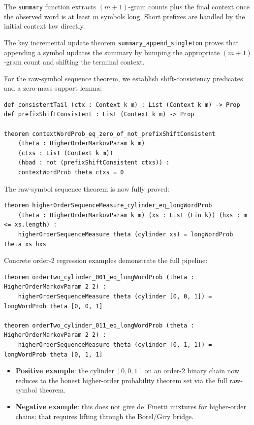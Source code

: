 \documentclass[11pt,a4paper]{article}
\theoremstyle{definition}
\begin{document}
The \texttt{summary} function extracts $(m+1)$-gram counts plus the final
context once the observed word is at least $m$ symbols long. Short prefixes
are handled by the initial context law directly.

The key incremental update theorem \texttt{summary\_append\_singleton} proves
that appending a symbol updates the summary by bumping the appropriate
$(m+1)$-gram count and shifting the terminal context.

For the raw-symbol sequence theorem, we establish shift-consistency predicates
and a zero-mass support lemma:
\begin{lstlisting}
def consistentTail (ctx : Context k m) : List (Context k m) -> Prop
def prefixShiftConsistent : List (Context k m) -> Prop

theorem contextWordProb_eq_zero_of_not_prefixShiftConsistent
    (theta : HigherOrderMarkovParam k m)
    (ctxs : List (Context k m))
    (hbad : not (prefixShiftConsistent ctxs)) :
    contextWordProb theta ctxs = 0
\end{lstlisting}

The raw-symbol sequence theorem is now fully proved:
\begin{lstlisting}
theorem higherOrderSequenceMeasure_cylinder_eq_longWordProb
    (theta : HigherOrderMarkovParam k m) (xs : List (Fin k)) (hxs : m <= xs.length) :
    higherOrderSequenceMeasure theta (cylinder xs) = longWordProb theta xs hxs
\end{lstlisting}

Concrete order-2 regression examples demonstrate the full pipeline:
\begin{lstlisting}
theorem orderTwo_cylinder_001_eq_longWordProb (theta : HigherOrderMarkovParam 2 2) :
    higherOrderSequenceMeasure theta (cylinder [0, 0, 1]) = longWordProb theta [0, 0, 1]

theorem orderTwo_cylinder_011_eq_longWordProb (theta : HigherOrderMarkovParam 2 2) :
    higherOrderSequenceMeasure theta (cylinder [0, 1, 1]) = longWordProb theta [0, 1, 1]
\end{lstlisting}

\begin{itemize}
\item \textbf{Positive example}: the cylinder $[0,0,1]$ on an order-2 binary chain
  now reduces to the honest higher-order probability theorem set via the full
  raw-symbol theorem.
\item \textbf{Negative example}: this does not give de~Finetti mixtures for
  higher-order chains; that requires lifting through the Borel/Giry bridge.
\end{itemize}
\end{document}

